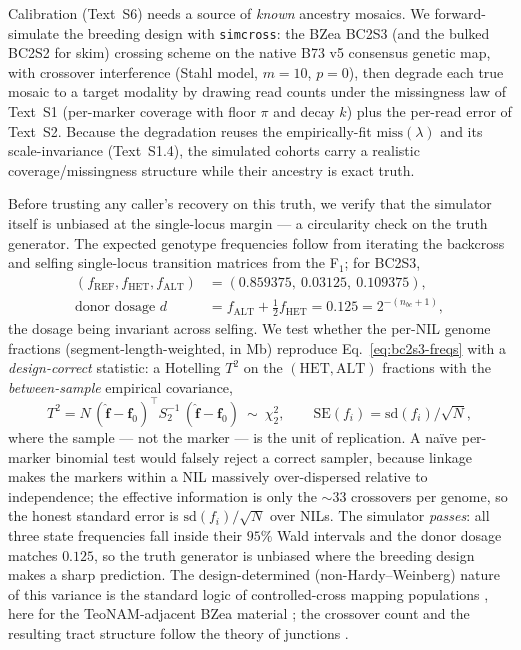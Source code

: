\documentclass[11pt]{article}
\newcommand{\REF}{\mathrm{REF}}
\newcommand{\HET}{\mathrm{HET}}
\newcommand{\ALT}{\mathrm{ALT}}
\newcommand{\miss}{\mathrm{miss}}
\newcommand{\cov}{\lambda}                          %
\begin{document}
Calibration (Text~S6) needs a source of \emph{known} ancestry mosaics. We
forward-simulate the breeding design with \texttt{simcross}: the BZea BC2S3 (and the
bulked BC2S2 for skim) crossing scheme on the native B73 v5 consensus genetic map,
with crossover interference (Stahl model, $m=10$, $p=0$), then degrade each true
mosaic to a target modality by drawing read counts under the missingness law of
Text~S1 (per-marker coverage with floor $\pi$ and decay $k$) plus the per-read error
of Text~S2. Because the degradation reuses the empirically-fit $\miss(\cov)$ and its
scale-invariance (Text~S1.4), the simulated cohorts carry a realistic
coverage/missingness structure while their ancestry is exact truth.

Before trusting any caller's recovery on this truth, we verify that the simulator
itself is unbiased at the single-locus margin --- a circularity check on the truth
generator. The expected genotype frequencies follow from iterating the backcross and
selfing single-locus transition matrices from the F$_1$; for BC2S3,
\begin{equation}
\begin{aligned}
(f_{\REF},f_{\HET},f_{\ALT}) &= (0.859375,\ 0.03125,\ 0.109375),\\
\text{donor dosage } d &= f_{\ALT}+\tfrac12 f_{\HET} = 0.125 = 2^{-(n_{bc}+1)},
\end{aligned}
\label{eq:bc2s3-freqs}
\end{equation}
the dosage being invariant across selfing. We test whether the per-NIL genome
fractions (segment-length-weighted, in Mb) reproduce Eq.~\eqref{eq:bc2s3-freqs} with
a \emph{design-correct} statistic: a Hotelling $T^2$ on the $(\HET,\ALT)$ fractions
with the \emph{between-sample} empirical covariance,
\begin{equation}
T^2 = N\,(\hat{\mathbf f}-\mathbf f_0)^{\!\top} S_2^{-1}\,(\hat{\mathbf f}-\mathbf f_0)
\ \sim\ \chi^2_2,
\qquad
\mathrm{SE}(f_i)=\mathrm{sd}(f_i)/\sqrt{N},
\label{eq:hotelling}
\end{equation}
where the sample --- not the marker --- is the unit of replication. A na\"ive
per-marker binomial test would falsely reject a correct sampler, because linkage
makes the markers within a NIL massively over-dispersed relative to independence; the
effective information is only the $\sim\!33$ crossovers per genome, so the honest
standard error is $\mathrm{sd}(f_i)/\sqrt{N}$ over NILs. The simulator \emph{passes}:
all three state frequencies fall inside their $95\%$ Wald intervals and the donor
dosage matches $0.125$, so the truth generator is unbiased where the breeding design
makes a sharp prediction. The design-determined (non-Hardy--Weinberg) nature of this
variance is the standard logic of controlled-cross mapping populations
\citep{lander_botstein_1989,yu_2008,buckler_2009}, here for the TeoNAM-adjacent BZea
material \citep{chen2019teonam}; the crossover count and the resulting tract
structure follow the theory of junctions \citep{fisher_1954,stam_1980}.
\end{document}
